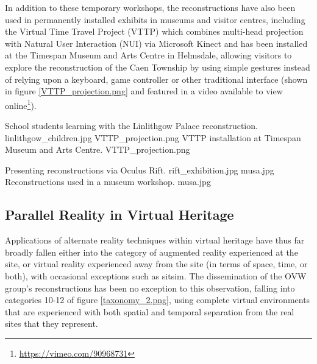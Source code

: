 In addition to these temporary workshops, the reconstructions have also been used in permanently installed exhibits in museums and visitor centres, including the Virtual Time Travel Project (VTTP) which combines multi-head projection with Natural User Interaction (NUI) via Microsoft Kinect and has been installed at the Timespan Museum and Arts Centre in Helmsdale, allowing visitors to explore the reconstruction of the Caen Township by using simple gestures instead of relying upon a keyboard, game controller or other traditional interface (shown in figure \ref{VTTP_projection.png} and featured in a video available to view online\footnote{\url{https://vimeo.com/90968731}}).

 {School students learning with the Linlithgow Palace reconstruction.} {linlithgow_children.jpg}
       {VTTP_projection.png} {VTTP installation at Timespan Museum and Arts Centre.} {VTTP_projection.png}

 {Presenting reconstructions via Oculus Rift.} {rift_exhibition.jpg}
       {musa.jpg} {Reconstructions used in a museum workshop.} {musa.jpg}


\subsection{Parallel Reality in Virtual Heritage}

\label{parallel-reality-in-virtual-heritage}


Applications of alternate reality techniques within virtual heritage have thus far broadly fallen either into the category of augmented reality experienced at the site, or virtual reality experienced away from the site (in terms of space, time, or both), with occasional exceptions such as sitsim. The dissemination of the OVW group's reconstructions has been no exception to this observation, falling into categories 10-12 of figure \ref{taxonomy_2.png}, using complete virtual environments that are experienced with both spatial and temporal separation from the real sites that they represent.

